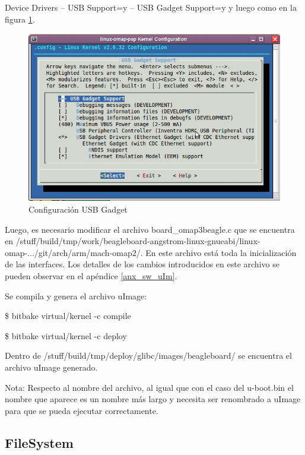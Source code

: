 Device Drivers – USB Support=y – USB Gadget Support=y y luego como en la figura \ref{Fig:usb}.

\begin{figure}[H]
\centering
  \begin{center}
  \includegraphics[scale=.4]{Imagenes/usb_chica.png} 
  \end{center}
  \caption{Configuración USB Gadget}\label{Fig:usb} 
\end{figure}

Luego, es necesario modificar el archivo board\_omap3beagle.c que se encuentra en /stuff/build/tmp/work/beagleboard-angstrom-linux-gnueabi/linux-omap-.../git/arch/arm/mach-omap2/. En este archivo está toda la inicialización de las interfaces. Los detalles de los cambios introducidos en este archivo se pueden observar en el apéndice \ref{anx_sw_uIm}.

\bigskip
Se compila y genera el archivo uImage:

\bigskip
\centerline{\$ bitbake virtual/kernel -c compile}

\centerline{\$ bitbake virtual/kernel -c deploy}

\bigskip
Dentro de /stuff/build/tmp/deploy/glibc/images/beagleboard/ se encuentra el archivo uImage generado.

\bigskip
Nota: Respecto al nombre del archivo, al igual que con el caso del u-boot.bin el nombre que aparece es un nombre más largo y necesita ser renombrado a uImage para que se pueda ejecutar correctamente.

\subsection{FileSystem}

